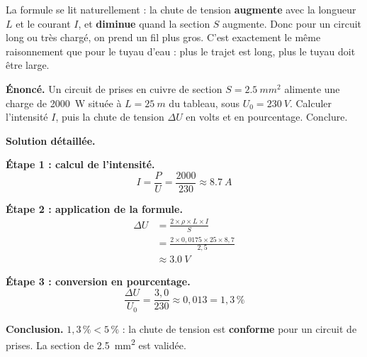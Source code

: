 \documentclass[11pt]{article}
\begin{document}
\begin{exemplebox}
La formule se lit naturellement : la chute de tension \textbf{augmente} avec la longueur $L$ et le courant $I$, et \textbf{diminue} quand la section $S$ augmente. Donc pour un circuit long ou très chargé, on prend un fil plus gros. C'est exactement le même raisonnement que pour le tuyau d'eau : plus le trajet est long, plus le tuyau doit être large.
\end{exemplebox}

\begin{exoresolu}
\textbf{Énoncé.} Un circuit de prises en cuivre de section $S = \SI{2,5}{mm^2}$ alimente une charge de \SI{2000}{W} située à $L = \SI{25}{m}$ du tableau, sous $U_0 = \SI{230}{V}$. Calculer l'intensité $I$, puis la chute de tension $\Delta U$ en volts et en pourcentage. Conclure.

\tcblower
\textbf{Solution détaillée.}

\textbf{Étape 1 : calcul de l'intensité.}
\[ I = \frac{P}{U} = \frac{2000}{230} \approx \SI{8,7}{A} \]

\textbf{Étape 2 : application de la formule.}
\begin{align*}
\Delta U &= \frac{2 \times \rho \times L \times I}{S} \\
&= \frac{2 \times 0{,}0175 \times 25 \times 8{,}7}{2{,}5} \\
&\approx \SI{3,0}{V}
\end{align*}

\textbf{Étape 3 : conversion en pourcentage.}
\[ \frac{\Delta U}{U_0} = \frac{3{,}0}{230} \approx 0{,}013 = 1{,}3\,\% \]

\textbf{Conclusion.} $1{,}3\,\% < 5\,\%$ : la chute de tension est \textbf{conforme} pour un circuit de prises. La section de \SI{2,5}{mm^2} est validée.
\end{exoresolu}
\end{document}
